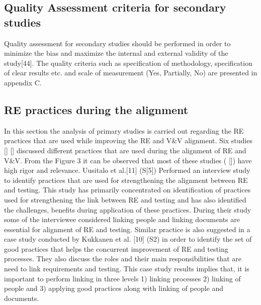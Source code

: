\documentclass{article}
\begin{document}
\subsection{Quality Assessment criteria for secondary studies}

Quality assessment for secondary studies should be performed in order to minimize the bias and maximize the internal and external validity of the study[44]. The quality criteria such as specification of methodology, specification of clear results etc. and scale of measurement (Yes, Partially, No) are presented in appendix C. 

\subsection{RE practices during the alignment}\label{ResultsPracticesDuringAllignment}

In this section the analysis of primary studies is carried out regarding the RE practices that are used while improving the RE and V\&V alignment. 
Six studies \cite{barmi2011alignment} \cite{kukkanen2009applying} \cite{uusitalo2008linking} \cite{bjarnason2014challenges} [\cite{bjarnason2015industrial}] [\cite{bjarnason2014alignment}] discussed different practices that are used during the alignment of RE and V\&V. From the Figure 3 it can be observed that most of these studies (\cite{kukkanen2009applying} \cite{uusitalo2008linking} \cite{bjarnason2014challenges} [\cite{bjarnason2014alignment}]) have high rigor and relevance. Uusitalo et al.[11] (S[5]) Performed an interview study to identify practices that are used for strengthening the alignment between RE and testing. This study has primarily concentrated on identification of practices used for strengthening the link between RE and testing and has also identified the challenges, benefits during application of these practices. During their study some of the interviewee considered linking people and linking documents are essential for alignment of RE and testing. Similar practice is also suggested in a case study conducted by Kukkanen et al. [10] (S2\cite{bjarnason2014challenges}) in order to identify the set of good practices that helps the concurrent improvement of RE and testing processes.  They also discuss the roles and their main responsibilities that are need to link requirements and testing. This case study results implies that, it is important to perform linking in three levels 1) linking processes 2) linking of people and 3) applying good practices along with linking of people and documents.
\end{document}
